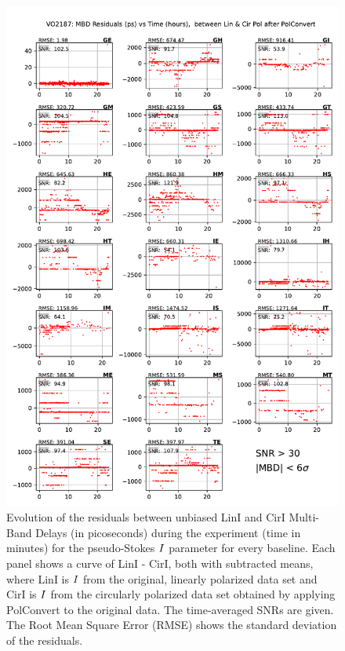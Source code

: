 \documentclass[letterpaper,twoside,12pt]{article}
\begin{document}
\begin{figure}[ht!]
  \begin{center}
  \includegraphics[width=33pc]{VO2187_MBD_Lin_I_minus_Cir_I_SNR_floor_30.pdf}
  \caption{\small Evolution of the residuals between unbiased LinI and CirI Multi-Band Delays (in picoseconds) during the experiment (time in minutes) for the pseudo-Stokes $\protect I$ parameter for every baseline. Each panel shows a curve of LinI - CirI, both with subtracted means, where LinI is $\protect I$ from the original, linearly polarized data set and CirI is $\protect I$ from the circularly polarized data set obtained by applying PolConvert to the original data. The time-averaged SNRs are given. The Root Mean Square Error (RMSE) shows the standard deviation of the residuals.}
  \label{mbd_lin_minus_cir}
  \end{center}
\end{figure}
\end{document}
